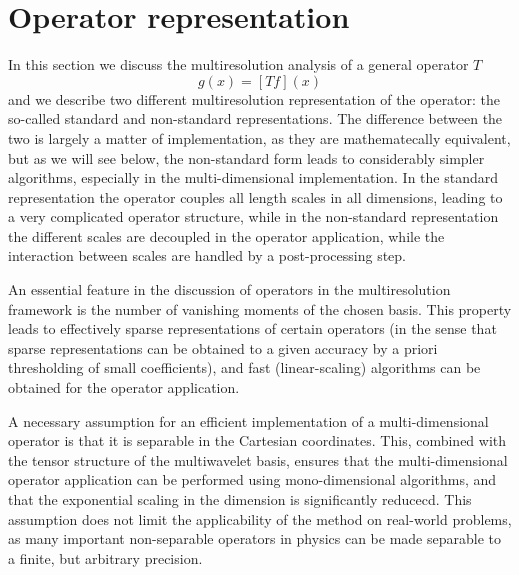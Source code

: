 \section{Operator representation}\label{sec:operator}
In this section we discuss the multiresolution analysis of a general operator $T$
\begin{equation}
    g(x) = [Tf](x)
\end{equation}
and we describe two different multiresolution representation of the operator: the 
so-called standard and non-standard representations. The difference between 
the two is largely a matter of implementation, as they are mathematecally equivalent,
but as we will see below, the non-standard form leads to considerably simpler algorithms, 
especially in the multi-dimensional implementation. In the standard representation the
operator couples all length scales in all dimensions, leading to a very complicated
operator structure, while in the non-standard representation the different scales are 
decoupled in the operator application, while the interaction between scales are handled 
by a post-processing step.

An essential feature in the discussion of operators in the multiresolution framework
is the number of vanishing moments of the chosen basis. This property leads to 
effectively sparse representations of certain operators (in the sense that sparse
representations can be obtained to a given accuracy by a priori thresholding of small 
coefficients), and fast (linear-scaling) algorithms can be obtained for the operator 
application.

A necessary assumption for an efficient implementation of a multi-dimensional operator
is that it is separable in the Cartesian coordinates. This, combined with the tensor
structure of the multiwavelet basis, ensures that the multi-dimensional operator 
application can be performed using mono-dimensional algorithms, and that the exponential
scaling in the dimension is significantly reducecd. This assumption does not
limit the applicability of the method on real-world problems, as many important 
non-separable operators in physics can be made separable to a finite, but arbitrary
precision.

